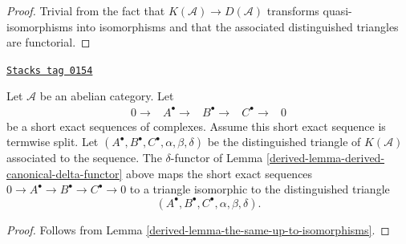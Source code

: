 \begin{proof}
Trivial from the fact that $K(\mathcal{A}) \to D(\mathcal{A})$
transforms quasi-isomorphisms into isomorphisms and that the
associated distinguished triangles are functorial.
\end{proof}

\begin{lemma}
\label{derived-lemma-derived-compare-triangles-split-case}
\href{https://stacks.math.columbia.edu/tag/0154}{\texttt{Stacks tag 0154}}

Let $\mathcal{A}$ be an abelian category. Let
$$
\begin{array}{ccccc}0 \longrightarrow & A^\bullet \longrightarrow & B^\bullet \longrightarrow & C^\bullet \longrightarrow & 0\end{array}
$$
be a short exact sequences of complexes.
Assume this short exact sequence is termwise split. Let
$(A^\bullet, B^\bullet, C^\bullet, \alpha, \beta, \delta)$
be the distinguished triangle of $K(\mathcal{A})$
associated to the sequence. The $\delta$-functor of
Lemma \ref{derived-lemma-derived-canonical-delta-functor}
above maps the short exact sequences
$0 \to A^\bullet \to B^\bullet \to C^\bullet \to 0$
to a triangle isomorphic to the distinguished triangle
$$
(A^\bullet, B^\bullet, C^\bullet, \alpha, \beta, \delta).
$$
\end{lemma}

\begin{proof}

Follows from
Lemma \ref{derived-lemma-the-same-up-to-isomorphisms}.
\end{proof}

